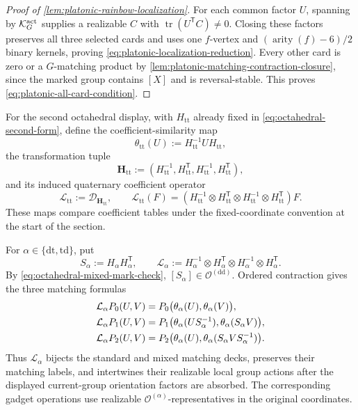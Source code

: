\documentclass[11pt,letterpaper,onecolumn]{article}
\theoremstyle{plain}
\theoremstyle{definition}
\theoremstyle{remark}
\newcommand{\OctDD}{{\mathcal O^{(\mathrm{dd})}}}
\newcommand{\OctForm}[1]{{\mathcal O^{(#1)}}}
\newcommand{\arity}{\operatorname{arity}}
\begin{document}
\begin{proof}[Proof of \cref{lem:platonic-rainbow-localization}]
For each common factor \(U\), spanning by \(\mathcal K_G^{\rm act}\)
supplies a realizable \(C\) with \(\operatorname{tr}(U^{\mathsf T}C)\ne0\).
Closing these factors preserves all three selected cards and uses one
\(f\)-vertex and \((\arity(f)-6)/2\) binary kernels, proving
\cref{eq:platonic-localization-reduction}. Every other card is zero or a
\(G\)-matching product by \cref{lem:platonic-matching-contraction-closure},
since the marked group contains \([X]\) and is reversal-stable.
This proves \cref{eq:platonic-all-card-condition}.
\end{proof}

For the second octahedral display, with \(H_{\mathrm{tt}}\) already fixed in
\cref{eq:octahedral-second-form}, define the coefficient-similarity map
\begin{equation}
 \theta_{\mathrm{tt}}(U):=H_{\mathrm{tt}}^{-1}UH_{\mathrm{tt}},
 \label{eq:octahedral-coefficient-map}
\end{equation}
the transformation tuple
\[
 \mathbf H_{\mathrm{tt}}:=
 (H_{\mathrm{tt}}^{-1},H_{\mathrm{tt}}^{\mathsf T},
  H_{\mathrm{tt}}^{-1},H_{\mathrm{tt}}^{\mathsf T}),
\]
and its induced quaternary coefficient operator
\[
 \mathcal L_{\mathrm{tt}}:=\mathscr D_{\mathbf H_{\mathrm{tt}}},
 \qquad
 \mathcal L_{\mathrm{tt}}(F)=
 (H_{\mathrm{tt}}^{-1}\otimes H_{\mathrm{tt}}^{\mathsf T}\otimes
  H_{\mathrm{tt}}^{-1}\otimes H_{\mathrm{tt}}^{\mathsf T})F.
\]
These maps compare coefficient tables under the fixed-coordinate
convention at the start of the section.

For \(\alpha\in\{\mathrm{dt},\mathrm{td}\}\), put
\[
 S_\alpha:=H_\alpha H_\alpha^{\mathsf T},\qquad
 \mathcal L_\alpha:=
 H_\alpha^{-1}\otimes H_\alpha^{\mathsf T}\otimes
 H_\alpha^{-1}\otimes H_\alpha^{\mathsf T}.
\]
By \cref{eq:octahedral-mixed-mark-check}, \([S_\alpha]\in\OctDD\).
Ordered contraction gives the three matching formulas
\begin{align}
 \mathcal L_\alpha P_0(U,V)&=
  P_0\bigl(\theta_\alpha(U),\theta_\alpha(V)\bigr),\notag\\
 \mathcal L_\alpha P_1(U,V)&=
  P_1\bigl(\theta_\alpha(US_\alpha^{-1}),
            \theta_\alpha(S_\alpha V)\bigr),\notag\\
 \mathcal L_\alpha P_2(U,V)&=
  P_2\bigl(\theta_\alpha(U),
            \theta_\alpha(S_\alpha VS_\alpha^{-1})\bigr).
 \label{eq:octahedral-mixed-coefficient-transport}
\end{align}
Thus \(\mathcal L_\alpha\) bijects the standard and mixed matching decks,
preserves their matching labels, and intertwines their realizable local group
actions after the displayed current-group orientation factors are absorbed.
The corresponding gadget operations use realizable
\(\OctForm{\alpha}\)-representatives in the original coordinates.
\end{document}
